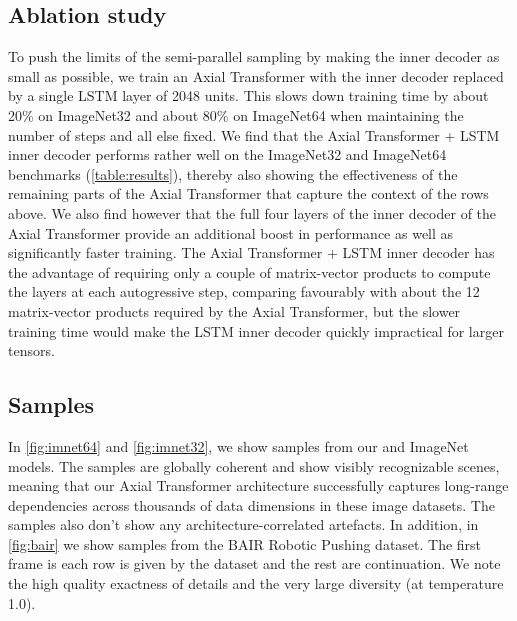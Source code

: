 \documentclass{article} \usepackage{iclr2020_conference,times}
\begin{document}
\subsection{Ablation study}

To push the limits of the semi-parallel sampling by making the inner decoder as small as possible, we train an Axial Transformer with the inner decoder replaced by a single LSTM layer of 2048 units. This slows down training time by about 20\% on ImageNet32 and about 80\% on ImageNet64 when maintaining the number of steps and all else fixed. We find that the Axial Transformer + LSTM inner decoder performs rather well on the ImageNet32 and ImageNet64 benchmarks (\cref{table:results}), thereby also showing the effectiveness of the remaining parts of the Axial Transformer that capture the context of the rows above. We also find however that the full four layers of the inner decoder of the Axial Transformer provide an additional boost in performance as well as significantly faster training. The Axial Transformer + LSTM inner decoder has the advantage of requiring only a couple of matrix-vector products to compute the layers at each autogressive step, comparing favourably with about the 12 matrix-vector products required by the Axial Transformer, but the slower training time would make the LSTM inner decoder quickly impractical for larger tensors.

\subsection{Samples}

In \cref{fig:imnet64} and \cref{fig:imnet32}, we show samples from our  and  ImageNet models. The samples are globally coherent and show visibly recognizable scenes, meaning that our Axial Transformer architecture successfully captures long-range dependencies across thousands of data dimensions in these image datasets. The samples also don't show any architecture-correlated artefacts. In addition, in \cref{fig:bair} we show samples from the BAIR Robotic Pushing dataset. The first frame is each row is given by the dataset and the rest are continuation. We note the high quality exactness of details and the very large diversity (at temperature 1.0).
\end{document}

